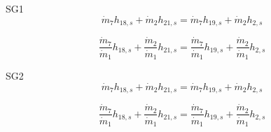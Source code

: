 \documentclass{article}
\begin{document}
SG1
\begin{equation}
\dot{m}_{ 7}h_{18,s} + \dot{m}_{ 2}h_{21,s} = \dot{m}_{ 7}h_{19,s} + \dot{m}_{ 2}h_{ 2,s}
\end{equation}

\begin{equation}
\frac{\dot{m}_{ 7}}{\dot{m}_{ 1}}h_{18,s} + \frac{\dot{m}_{ 2}}{\dot{m}_{ 1}}h_{21,s} = \frac{\dot{m}_{ 7}}{\dot{m}_{ 1}}h_{19,s} + \frac{\dot{m}_{ 2}}{\dot{m}_{ 1}}h_{ 2,s}
\end{equation}


SG2
\begin{equation}
\dot{m}_{ 7}h_{18,s} + \dot{m}_{ 2}h_{21,s} = \dot{m}_{ 7}h_{19,s} + \dot{m}_{ 2}h_{ 2,s}
\end{equation}

\begin{equation}
\frac{\dot{m}_{ 7}}{\dot{m}_{ 1}}h_{18,s} + \frac{\dot{m}_{ 2}}{\dot{m}_{ 1}}h_{21,s} = \frac{\dot{m}_{ 7}}{\dot{m}_{ 1}}h_{19,s} + \frac{\dot{m}_{ 2}}{\dot{m}_{ 1}}h_{ 2,s}
\end{equation}
\end{document}
